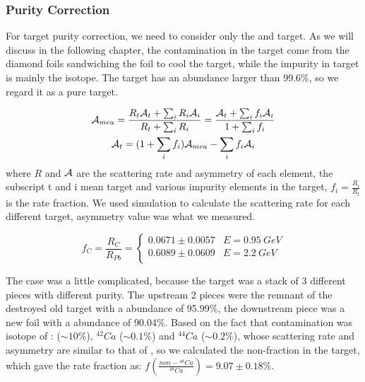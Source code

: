 \subsubsection{Purity Correction}
For target purity correction, we need to consider only the \Pb and \Ca target.
As we will discuss in the following chapter, the contamination in the \Pb target
come from the diamond foils sandwiching the \Pb foil to cool the target, while
the impurity in \Ca target is mainly the \ca isotope. The \ca target has an abundance
larger than 99.6\%, so we regard it as a pure target.

\begin{equation}
    \begin{gathered}
	\mathcal{A}_{mea} = \frac{R_t\mathcal{A}_t + \sum_i R_i \mathcal{A}_i}{R_t + \sum_i R_i} = \frac{\mathcal{A}_t + \sum_i f_i \mathcal{A}_i}{1 + \sum_i f_i}  \\
	\mathcal{A}_t = (1 + \sum_i f_i)\mathcal{A}_{mea} - \sum_i f_i\mathcal{A}_i
    \end{gathered}
    \label{eq:AT-asymmetry_correction}
\end{equation}
where $R$ and $\mathcal{A}$ are the scattering rate and asymmetry of each element, the
subscript t and i mean target and various impurity elements in the target, 
$f_i = \frac{R_i}{R_t}$ is the rate fraction. 
We used simulation to calculate the scattering rate for each different
target, asymmetry value was what we measured.

\begin{equation}
    f_C = \frac{R_C}{R_{Pb}} = 
    \begin{cases}
	0.0671 \pm 0.0057   & E = 0.95\ GeV	\\
	0.6089 \pm 0.0609   & E = 2.2\ GeV	\\
    \end{cases}
\end{equation}

The \Ca case was a little complicated, because the \Ca target was a stack of 3 different
pieces with different purity. The upstream 2 pieces were the remnant of the destroyed
old target with a \Ca abundance of 95.99\%, the downstream piece was a new foil
with a \Ca abundance of 90.04\%. Based on the fact that contamination was isotope
of \Ca: \ca ($\sim10\%$), ${}^{42}Ca$ ($\sim0.1\%$) and ${}^{44}Ca$ ($\sim0.2\%$), whose 
scattering rate and asymmetry are similar to that of \Ca, so we calculated the
non-\Ca fraction in the \Ca target, which gave the rate fraction as: 
$f(\frac{non-{}^{48}Ca}{{}^{48}Ca}) = 9.07 \pm 0.18 \%$.


